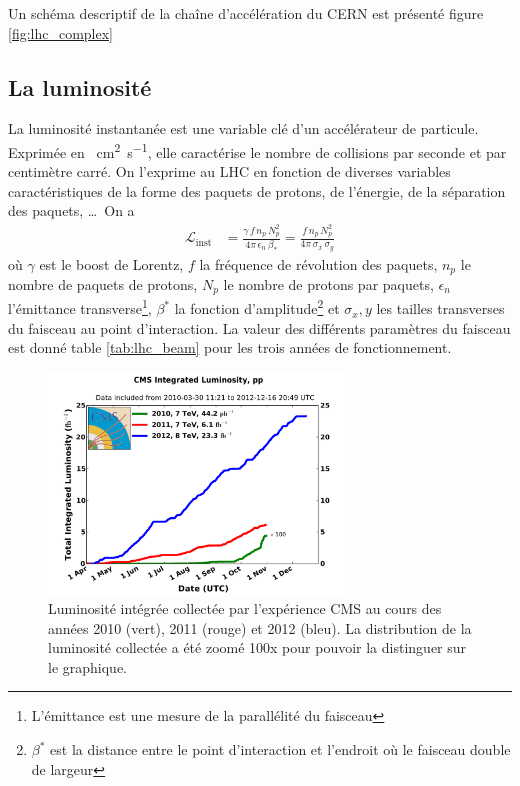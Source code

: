 Un schéma descriptif de la chaîne d'accélération du CERN est présenté figure \ref{fig:lhc_complex}

\subsection{La luminosité}

La luminosité instantanée est une variable clé d'un accélérateur de particule. Exprimée en \si{\per\square\cm\per\second}, elle caractérise le nombre de collisions par seconde et par centimètre carré. On l'exprime au LHC en fonction de diverses variables caractéristiques de la forme des paquets de protons,
de l'énergie, de la séparation des paquets, \ldots~On a
\begin{align*}
  \mathcal{L}_{\text{inst}} &= \frac{\gamma\,f\,n_p\,N_p^2}{4\pi\,\epsilon_n\,\beta_*} = \frac{f\,n_p\,N_p^2}{4\pi\,\sigma_x\,\sigma_y}
\end{align*}
où $\gamma$ est le boost de Lorentz, $f$ la fréquence de révolution des paquets, $n_p$ le nombre de paquets de protons, $N_p$ le nombre de protons par paquets, $\epsilon_n$ l'émittance transverse\footnote{L'émittance est une mesure de la parallélité du faisceau}, $\beta^*$ la fonction d'amplitude\footnote{$\beta^*$ est la distance entre le point d'interaction et l'endroit où le faisceau double de largeur} et $\sigma_x,y$ les tailles transverses du faisceau au point d'interaction. La valeur des différents paramètres du faisceau est donné table \ref{tab:lhc_beam} pour les trois années de fonctionnement.

\begin{figure} \centering
  \includegraphics[width=0.7\textwidth]{chapitre2/figs/CMS_lumi.pdf}
  \caption{Luminosité intégrée collectée par l'expérience CMS au cours des années 2010 (vert), 2011 (rouge) et 2012 (bleu). La distribution de la luminosité collectée a été zoomé 100x pour pouvoir la distinguer sur le graphique.}
  \label{fig:lumi}
\end{figure}


